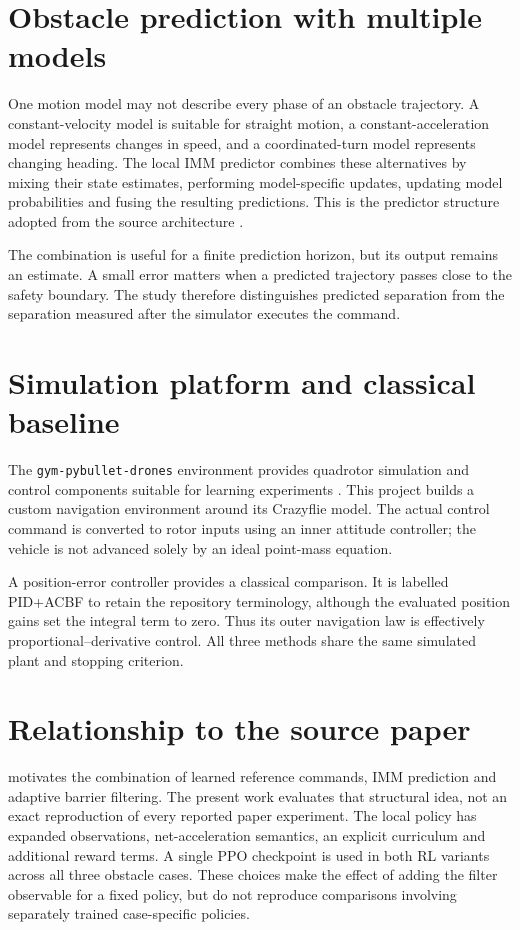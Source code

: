 \section{Obstacle prediction with multiple models}
One motion model may not describe every phase of an obstacle trajectory. A constant-velocity model is suitable for straight motion, a constant-acceleration model represents changes in speed, and a coordinated-turn model represents changing heading. The local IMM predictor combines these alternatives by mixing their state estimates, performing model-specific updates, updating model probabilities and fusing the resulting predictions. This is the predictor structure adopted from the source architecture \parencite{gao2026}.

The combination is useful for a finite prediction horizon, but its output remains an estimate. A small error matters when a predicted trajectory passes close to the safety boundary. The study therefore distinguishes predicted separation from the separation measured after the simulator executes the command.

\section{Simulation platform and classical baseline}
The \texttt{gym-pybullet-drones} environment provides quadrotor simulation and control components suitable for learning experiments \parencite{panerati2021}. This project builds a custom navigation environment around its Crazyflie model. The actual control command is converted to rotor inputs using an inner attitude controller; the vehicle is not advanced solely by an ideal point-mass equation.

A position-error controller provides a classical comparison. It is labelled PID+ACBF to retain the repository terminology, although the evaluated position gains set the integral term to zero. Thus its outer navigation law is effectively proportional--derivative control. All three methods share the same simulated plant and stopping criterion.

\section{Relationship to the source paper}
\textcite{gao2026} motivates the combination of learned reference commands, IMM prediction and adaptive barrier filtering. The present work evaluates that structural idea, not an exact reproduction of every reported paper experiment. The local policy has expanded observations, net-acceleration semantics, an explicit curriculum and additional reward terms. A single PPO checkpoint is used in both RL variants across all three obstacle cases. These choices make the effect of adding the filter observable for a fixed policy, but do not reproduce comparisons involving separately trained case-specific policies.


